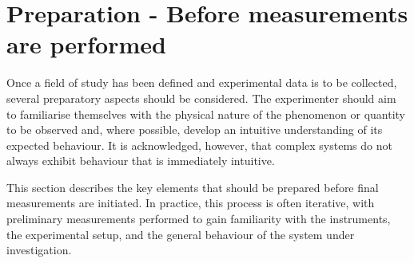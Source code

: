 \section{Preparation - Before measurements are performed}
Once a field of study has been defined and experimental data is to be collected, several preparatory aspects should be considered. The experimenter should aim to familiarise themselves with the physical nature of the phenomenon or quantity to be observed and, where possible, develop an intuitive understanding of its expected behaviour. It is acknowledged, however, that complex systems do not always exhibit behaviour that is immediately intuitive.

This section describes the key elements that should be prepared before final measurements are initiated. In practice, this process is often iterative, with preliminary measurements performed to gain familiarity with the instruments, the experimental setup, and the general behaviour of the system under investigation.




